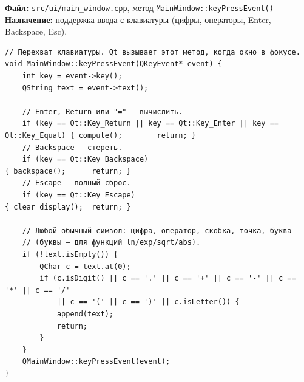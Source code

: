 



\noindent\textbf{Файл:} \texttt{src/ui/main\_window.cpp}, метод \texttt{MainWindow::keyPressEvent()}\\
\textbf{Назначение:} поддержка ввода с клавиатуры (цифры, операторы, Enter, Backspace, Esc).

\begin{lstlisting}
// Перехват клавиатуры. Qt вызывает этот метод, когда окно в фокусе.
void MainWindow::keyPressEvent(QKeyEvent* event) {
    int key = event->key();
    QString text = event->text();

    // Enter, Return или "=" — вычислить.
    if (key == Qt::Key_Return || key == Qt::Key_Enter || key == Qt::Key_Equal) { compute();        return; }
    // Backspace — стереть.
    if (key == Qt::Key_Backspace)                                               { backspace();      return; }
    // Escape — полный сброс.
    if (key == Qt::Key_Escape)                                                  { clear_display();  return; }

    // Любой обычный символ: цифра, оператор, скобка, точка, буква
    // (буквы — для функций ln/exp/sqrt/abs).
    if (!text.isEmpty()) {
        QChar c = text.at(0);
        if (c.isDigit() || c == '.' || c == '+' || c == '-' || c == '*' || c == '/'
            || c == '(' || c == ')' || c.isLetter()) {
            append(text);
            return;
        }
    }
    QMainWindow::keyPressEvent(event);
}
\end{lstlisting}


